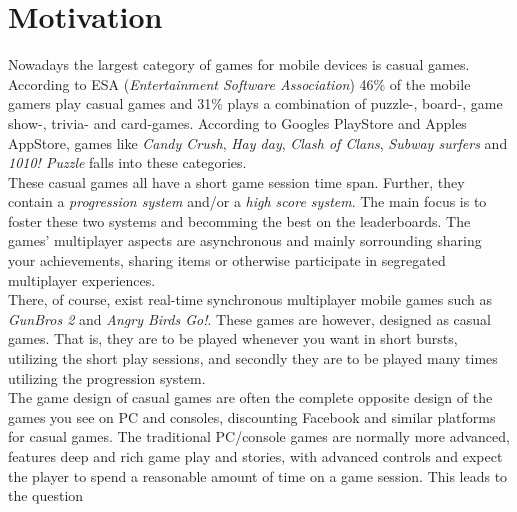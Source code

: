 \section{Motivation} \label{sec:motivation}
Nowadays the largest category of games for mobile devices is casual games. According to ESA\cite{ESA}\cite{ESApdf} (\textit{Entertainment Software Association}) 46\% of the mobile gamers play casual games and 31\% plays a combination of puzzle-, board-, game show-, trivia- and card-games. 
According to Googles PlayStore \cite{googleplay} and Apples AppStore\cite{appstore}, games like \textit{Candy Crush}, \textit{Hay day}, \textit{Clash of Clans}, \textit{Subway surfers} and \textit{1010! Puzzle} falls into these categories.\\

These casual games all have a short game session time span. Further, they contain a \textit{progression system} and/or a \textit{high score system}. The main focus is to foster these two systems and becomming the best on the leaderboards. The games' multiplayer aspects are asynchronous and mainly sorrounding sharing your achievements, sharing items or otherwise participate in segregated multiplayer experiences.\\

There, of course, exist real-time synchronous multiplayer mobile games such as \textit{GunBros 2} and \textit{Angry Birds Go!}. These games are however, designed as casual games. That is, they are to be played whenever you want in short bursts, utilizing the short play sessions, and secondly they are to be played many times utilizing the progression system.\\

The game design of casual games are often the complete opposite design of the games you see on PC and consoles, discounting Facebook and similar platforms for casual games. The traditional PC/console games are normally more advanced, features deep and rich game play and stories, with advanced controls and expect the player to spend a reasonable amount of time on a game session. This leads to the question 


